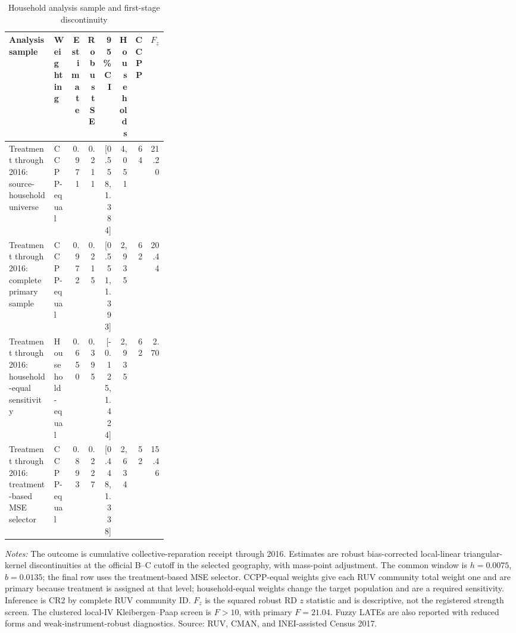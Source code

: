 \begin{table}[!htbp]
\centering
\scriptsize
\caption{Household analysis sample and first-stage discontinuity}
\label{tab:rd_outcomes_first_stage_2017_household}
\begin{tabular}{p{0.31\linewidth}lrrrrrr}
\toprule
Analysis sample & Weighting & Estimate & Robust SE & 95\% CI & Households & CCPP & \(F_z\) \\
\midrule
Treatment through 2016: source-household universe & CCPP-equal & 0.971 & 0.211 & [0.558, 1.384] & 4,051 & 64 & 21.20 \\
Treatment through 2016: complete primary sample & CCPP-equal & 0.972 & 0.215 & [0.551, 1.393] & 2,935 & 62 & 20.44 \\
Treatment through 2016: household-equal sensitivity & Household-equal & 0.650 & 0.395 & [-0.125, 1.424] & 2,935 & 62 & 2.70 \\
Treatment through 2016: treatment-based MSE selector & CCPP-equal & 0.893 & 0.227 & [0.448, 1.338] & 2,634 & 52 & 15.46 \\
\bottomrule
\end{tabular}
\parbox{0.97\linewidth}{\footnotesize \textit{Notes:} The outcome is cumulative collective-reparation receipt through 2016. Estimates are robust bias-corrected local-linear triangular-kernel discontinuities at the official B--C cutoff in the selected geography, with mass-point adjustment. The common window is \(h=0.0075\), \(b=0.0135\); the final row uses the treatment-based MSE selector. CCPP-equal weights give each RUV community total weight one and are primary because treatment is assigned at that level; household-equal weights change the target population and are a required sensitivity. Inference is CR2 by complete RUV community ID. \(F_z\) is the squared robust RD \(z\) statistic and is descriptive, not the registered strength screen. The clustered local-IV Kleibergen--Paap screen is \(F>10\), with primary \(F=21.04\). Fuzzy LATEs are also reported with reduced forms and weak-instrument-robust diagnostics. Source: RUV, CMAN, and INEI-assisted Census 2017.}
\end{table}
